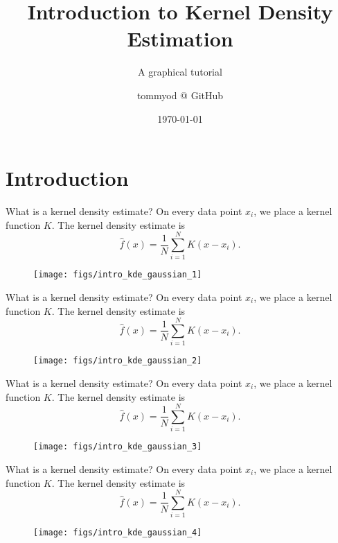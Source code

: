 \documentclass[11pt, aspectratio=149]{beamer}
\title{Introduction to Kernel Density Estimation}
\subtitle{A graphical tutorial}
\date{\today}
\author{tommyod @ GitHub}
\theoremstyle{plain}
\begin{document}
\maketitle


\section{Introduction}

\begin{frame}[fragile, t]{What is a kernel density estimate?}
	On every data point $x_i$, we place a kernel function $K$.
	The kernel density estimate is 
	\begin{equation*}
	\hat{f}(x) = \frac{1}{N} \sum_{i=1}^{N} K(x - x_i).
	\end{equation*}
	\vfill
	\begin{figure}
		\centering
		\texttt{[image: figs/intro\_kde\_gaussian\_1]}
	\end{figure}
\end{frame}


\begin{frame}[fragile, t]{What is a kernel density estimate?}
	On every data point $x_i$, we place a kernel function $K$.
	The kernel density estimate is 
	\begin{equation*}
	\hat{f}(x) = \frac{1}{N} \sum_{i=1}^{N} K(x - x_i).
	\end{equation*}
	\vfill
	\begin{figure}
		\centering
		\texttt{[image: figs/intro\_kde\_gaussian\_2]}
	\end{figure}
\end{frame}


\begin{frame}[fragile, t]{What is a kernel density estimate?}
	On every data point $x_i$, we place a kernel function $K$.
	The kernel density estimate is 
	\begin{equation*}
	\hat{f}(x) = \frac{1}{N} \sum_{i=1}^{N} K(x - x_i).
	\end{equation*}
	\vfill
	\begin{figure}
		\centering
		\texttt{[image: figs/intro\_kde\_gaussian\_3]}
	\end{figure}
\end{frame}


\begin{frame}[fragile, t]{What is a kernel density estimate?}
	On every data point $x_i$, we place a kernel function $K$.
	The kernel density estimate is 
	\begin{equation*}
	\hat{f}(x) = \frac{1}{N} \sum_{i=1}^{N} K(x - x_i).
	\end{equation*}
	\vfill
	\begin{figure}
		\centering
		\texttt{[image: figs/intro\_kde\_gaussian\_4]}
	\end{figure}
\end{frame}
\end{document}
